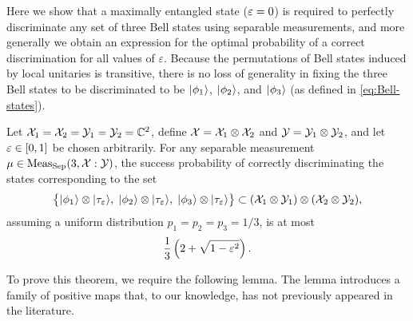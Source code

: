 Here we show that a maximally entangled state ($\varepsilon = 0$) is required to 
perfectly discriminate any set of three Bell states using separable
measurements, and more generally we obtain an expression for the optimal
probability of a correct discrimination for all values of $\varepsilon$.
Because the permutations of Bell states induced by local unitaries is
transitive, there is no loss of generality in fixing the three Bell states to
be discriminated to be $\lvert\mspace{0.5mu} \phi_1 \mspace{0.5mu} \rangle$, $\lvert\mspace{0.5mu} \phi_2 \mspace{0.5mu} \rangle$, and $\lvert\mspace{0.5mu} \phi_3 \mspace{0.5mu} \rangle$
(as defined in \eqref{eq:Bell-states}).

\begin{theorem}
  \label{thm:three-bell}
  Let $\mathcal{X}_1 = \mathcal{X}_2 = \mathcal{Y}_1 = \mathcal{Y}_2 = \mathbb{C}^2$, define 
  $\mathcal{X} = \mathcal{X}_1 \otimes \mathcal{X}_2$ and $\mathcal{Y} = \mathcal{Y}_1 \otimes \mathcal{Y}_2$, and let 
  $\varepsilon \in [0,1]$ be chosen arbitrarily. 
  For any separable measurement $\mu\in\mathrm{Meas}_{\mathrm{Sep}}(3,\mathcal{X}:\mathcal{Y})$, the
  success probability of correctly discriminating the states corresponding to
  the set
  \begin{equation}
    \label{eq:set-three-bells}
    \bigl\{ \lvert\mspace{0.5mu} \phi_{1} \mspace{0.5mu} \rangle \otimes \lvert\mspace{0.5mu} \tau_{\varepsilon} \mspace{0.5mu} \rangle,\; 
    \lvert\mspace{0.5mu} \phi_{2} \mspace{0.5mu} \rangle \otimes \lvert\mspace{0.5mu} \tau_{\varepsilon} \mspace{0.5mu} \rangle,\;
    \lvert\mspace{0.5mu} \phi_{3} \mspace{0.5mu} \rangle \otimes \lvert\mspace{0.5mu} \tau_{\varepsilon} \mspace{0.5mu} \rangle \bigr\}
    \subset (\mathcal{X}_1\otimes\mathcal{Y}_1)\otimes(\mathcal{X}_2\otimes\mathcal{Y}_2),
  \end{equation}
  assuming a uniform distribution $p_1 = p_2 = p_3 = 1/3$, is at most
  \begin{equation}
  \label{eq:probability-three-bell}
    \frac{1}{3}\left(2 + \sqrt{1 - \varepsilon^{2}}\right).
  \end{equation}
\end{theorem}

To prove this theorem, we require the following lemma.
The lemma introduces a family of positive maps that, to our knowledge, has not
previously appeared in the literature.

